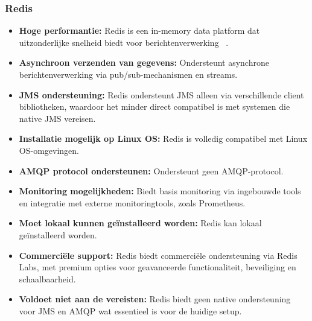 \subsubsection{Redis}
\begin{itemize}
    \item \textbf{Hoge performantie:} Redis is een in-memory data platform dat uitzonderlijke snelheid biedt voor berichtenverwerking ~\autocite{Saxena2024}.
    \item \textbf{Asynchroon verzenden van gegevens:} Ondersteunt asynchrone berichtenverwerking via pub/sub-mechanismen en streams.
    \item \textbf{JMS ondersteuning:} Redis ondersteunt JMS alleen via verschillende client bibliotheken, waardoor het minder direct compatibel is met systemen die native JMS vereisen.
    \item \textbf{Installatie mogelijk op Linux OS:} Redis is volledig compatibel met Linux OS-omgevingen.
    \item \textbf{AMQP protocol ondersteunen:} Ondersteunt geen AMQP-protocol.
    \item \textbf{Monitoring mogelijkheden:} Biedt basis monitoring via ingebouwde tools en integratie met externe monitoringtools, zoals Prometheus.
    \item \textbf{Moet lokaal kunnen geïnstalleerd worden:} Redis kan lokaal geïnstalleerd worden.
    \item \textbf{Commerciële support:} Redis biedt commerciële ondersteuning via Redis Labs, met premium opties voor geavanceerde functionaliteit, beveiliging en schaalbaarheid.
    \item \textbf{Voldoet niet aan de vereisten:} Redis biedt geen native ondersteuning voor JMS en AMQP wat essentieel is voor de huidige setup.
\end{itemize}
 

